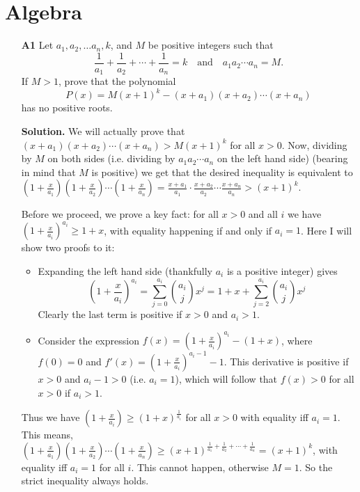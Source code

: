 \documentclass[11pt,a4paper]{article}
\begin{document}
\section{Algebra}
\begin{enumerate}
	\item[\textbf{A1}]Let $a_1,a_2,\ldots a_n,k$, and $M$ be positive integers such that
	$$\frac{1}{a_1}+\frac{1}{a_2}+\cdots+\frac{1}{a_n}=k\quad\text{and}\quad a_1a_2\cdots a_n=M.$$If $M>1$, prove that the polynomial
	$$P(x)=M(x+1)^k-(x+a_1)(x+a_2)\cdots (x+a_n)$$has no positive roots.
	
	\textbf{Solution.} We will actually prove that $(x+a_1)(x+a_2)\cdots (x+a_n) > M(x+1)^k$ for all $x > 0$. 
	Now, dividing by $M$ on both sides (i.e. dividing by $a_1a_2\cdots a_n$ on the left hand side) (bearing in mind that $M$ is positive) we get that the desired inequality is equivalent to 
	$(1+\frac{x}{a_1})(1+\frac{x}{a_2})\cdots (1+\frac{x}{a_n}) = \frac{x+a_1}{a_1}\cdot\frac{x+a_2}{a_2}\cdots \frac{x+a_n}{a_n} > (x+1)^k$. 
	
	Before we proceed, we prove a key fact: for all $x > 0$ and all $i$ we have $(1+\frac{x}{a_i})^{a_i} \ge 1+x$, with equality happening if and only if $a_i = 1$. Here I will show two proofs to it: 
	\begin{itemize}
		\item Expanding the left hand side (thankfully $a_i$ is a positive integer) gives 
		\[(1+\frac{x}{a_i})^{a_i}=\sum_{j=0}^{a_i}\binom{a_i}{j}x^j=1+x+\sum_{j=2}^{a_i}\binom{a_i}{j}x^j\]
		Clearly the last term is positive if $x>0$ and $a_i>1$. 
		\item Consider the expression $f(x)=(1+\frac{x}{a_i})^{a_i} - (1+x)$, where $f(0)=0$ and $f'(x)=(1+\frac{x}{a_i})^{a_i-1}-1$. This derivative is positive if $x>0$ and $a_i-1>0$ (i.e. $a_i=1$), which will follow that $f(x)>0$ for all $x>0$ if $a_i>1$. 
	\end{itemize}
Thus we have $(1+\frac{x}{a_i}) \ge (1+x)^{\frac{1}{a_i}}$ for all $x>0$ with equality iff $a_i=1$. This means, 
$(1+\frac{x}{a_1})(1+\frac{x}{a_2})\cdots (1+\frac{x}{a_n}) \ge (x+1)^{\frac{1}{a_1}+\frac{1}{a_2}+\cdots + \frac{1}{a_n}}=(x+1)^k$, with equality iff $a_i=1$ for all $i$. This cannot happen, otherwise $M=1$. So the strict inequality always holds. 


\end{enumerate}
\end{document}
